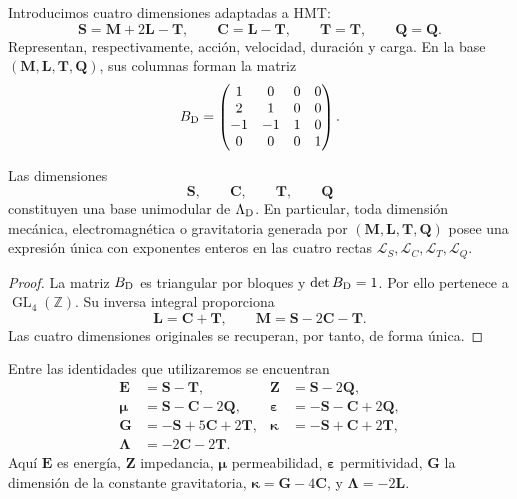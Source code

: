 Introducimos cuatro dimensiones adaptadas a HMT:
\[
 \mathbf S=\mathbf M+2\mathbf L-\mathbf T,
 \qquad
 \mathbf C=\mathbf L-\mathbf T,
 \qquad
 \mathbf T=\mathbf T,
 \qquad
 \mathbf Q=\mathbf Q.
\]
Representan, respectivamente, acción, velocidad, duración y carga. En la
base \((\mathbf M,\mathbf L,\mathbf T,\mathbf Q)\), sus columnas forman la
matriz
\[
 B_{\rm D}=
 \begin{pmatrix}
 1&0&0&0\\
 2&1&0&0\\
 -1&-1&1&0\\
 0&0&0&1
 \end{pmatrix}.
\]

\begin{theorem}
\label{thm:base-dimensional-hmt}
Las dimensiones
\[
 \mathbf S,\qquad\mathbf C,\qquad\mathbf T,\qquad\mathbf Q
\]
constituyen una base unimodular de
\(\Lambda_{\rm D}\). En particular, toda dimensión mecánica,
electromagnética o gravitatoria generada por
\((\mathbf M,\mathbf L,\mathbf T,\mathbf Q)\) posee una expresión única con
exponentes enteros en las cuatro rectas
\(\mathcal L_S,\mathcal L_C,\mathcal L_T,\mathcal L_Q\).
\end{theorem}

\begin{proof}
La matriz \(B_{\rm D}\) es triangular por bloques y
\(\det B_{\rm D}=1\). Por ello pertenece a
\(\operatorname{GL}_4(\mathbb Z)\). Su inversa integral proporciona
\[
 \mathbf L=\mathbf C+\mathbf T,
 \qquad
 \mathbf M=\mathbf S-2\mathbf C-\mathbf T.
\]
Las cuatro dimensiones originales se recuperan, por tanto, de forma única.
\end{proof}

Entre las identidades que utilizaremos se encuentran
\begin{align}
 \mathbf E&=\mathbf S-\mathbf T,
 &\mathbf Z&=\mathbf S-2\mathbf Q,\label{eq:dim-EZ}\\
 \boldsymbol\mu&=\mathbf S-\mathbf C-2\mathbf Q,
 &\boldsymbol\varepsilon&=-\mathbf S-\mathbf C+2\mathbf Q,
 \label{eq:dim-mueps}\\
 \mathbf G&=-\mathbf S+5\mathbf C+2\mathbf T,
 &\boldsymbol\kappa&=-\mathbf S+\mathbf C+2\mathbf T,
 \label{eq:dim-Gkappa}\\
 \boldsymbol\Lambda&=-2\mathbf C-2\mathbf T.
 \label{eq:dim-Lambda}
\end{align}
Aquí \(\mathbf E\) es energía, \(\mathbf Z\) impedancia,
\(\boldsymbol\mu\) permeabilidad, \(\boldsymbol\varepsilon\)
permitividad, \(\mathbf G\) la dimensión de la constante gravitatoria,
\(\boldsymbol\kappa=\mathbf G-4\mathbf C\), y
\(\boldsymbol\Lambda=-2\mathbf L\).

